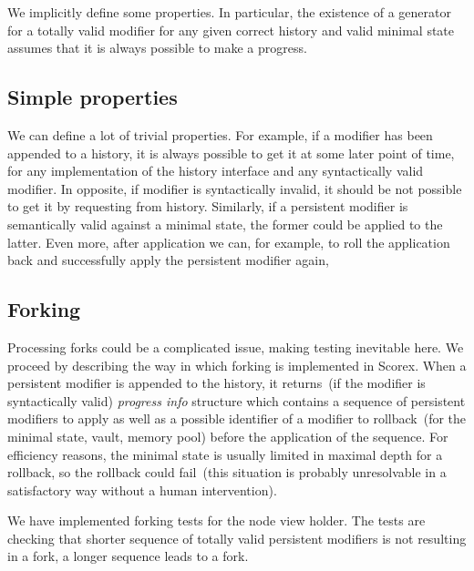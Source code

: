 We implicitly define some properties. In particular, the existence of a generator for a totally valid modifier for any given correct history and valid minimal state assumes that it is always possible to make a progress. 

\subsection{Simple properties}

We can define a lot of trivial properties. For example, if a modifier has been appended to a history, it is always possible to get it at some later point of time, for any implementation of the history interface and any syntactically valid modifier. In opposite, if modifier is syntactically invalid, it should be not possible to get it by requesting from history. Similarly, if a persistent modifier is semantically valid against a minimal state, the former could be applied to the latter. Even more, after application we can, for example, to roll the application back and successfully apply the persistent modifier again, 

\subsection{Forking}

Processing forks could be a complicated issue, making testing inevitable here. We proceed by describing the way in which forking is implemented in Scorex. When a persistent modifier is appended to the history, it returns~(if the modifier is syntactically valid) {\em progress info} structure which contains a sequence of persistent modifiers to apply as well as a possible identifier of a modifier to rollback~(for the minimal state, vault, memory pool) before the application of the sequence. For efficiency reasons, the minimal state is usually limited in maximal depth for a rollback, so the rollback could fail~(this situation is probably unresolvable in a satisfactory way without a human intervention). 

We have implemented forking tests for the node view holder. The tests are checking that shorter sequence of totally valid persistent modifiers is not resulting in a fork, a longer sequence leads to a fork. 
